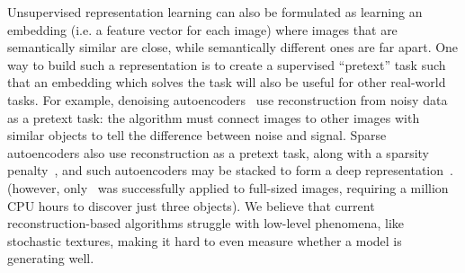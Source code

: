 \documentclass[10pt,twocolumn,letterpaper]{article}
\begin{document}



Unsupervised representation learning can also be formulated as learning an embedding (i.e. a feature vector for each image) where images that are semantically similar are close, while semantically different ones are far apart. 
One way to build such a representation is to create a supervised ``pretext'' task such that an embedding which solves the task will also be useful for other real-world tasks.  For example, denoising autoencoders~\cite{vincent2008extracting,bengio2013deep} use reconstruction from noisy data as a pretext task: the algorithm must connect images to other images with similar objects to tell the difference between noise and signal. Sparse autoencoders also use reconstruction as a pretext task, along with a sparsity penalty~\cite{olshausen1996emergence}, and such autoencoders may be stacked to form a deep representation~\cite{lee2006efficient,le2013building}. 
(however, only~\cite{le2013building} was successfully applied to full-sized images, requiring a million CPU hours to discover just three objects). 
We believe that current reconstruction-based algorithms struggle with low-level phenomena, like stochastic textures, making it hard to even measure whether a model is generating well.  
\end{document}
